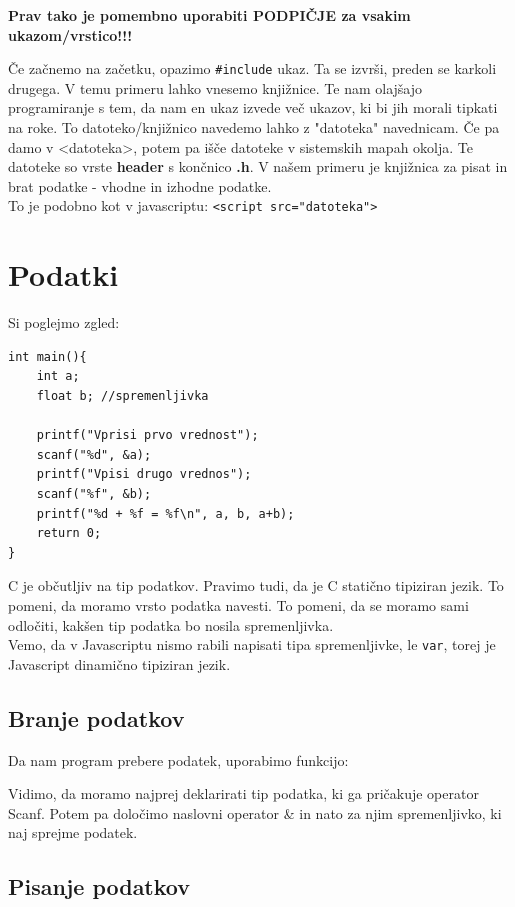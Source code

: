 \documentclass[a4paper, 12pt]{article}
\begin{document}
\textbf{Prav tako je pomembno uporabiti PODPIČJE za vsakim ukazom/vrstico!!!}

Če začnemo na začetku, opazimo \texttt{\#include} ukaz. Ta se izvrši, preden se karkoli drugega. V temu primeru lahko vnesemo knjižnice. Te nam olajšajo programiranje s tem, da nam en ukaz izvede več ukazov, ki bi jih morali tipkati na roke. To datoteko/knjižnico navedemo lahko z "datoteka" navednicam. Če pa damo v <datoteka>, potem pa išče datoteke v sistemskih mapah okolja. Te datoteke so vrste \textbf{header} s končnico \textbf{.h}. V našem primeru je knjižnica za pisat in brat podatke - vhodne in izhodne podatke.\\
To je podobno kot v javascriptu:  \lstinline|<script src="datoteka">|\ 
\section{Podatki}
Si poglejmo zgled:
\begin{lstlisting}
int main(){
	int a;
	float b; //spremenljivka

	printf("Vprisi prvo vrednost");
	scanf("%d", &a);
	printf("Vpisi drugo vrednos");
	scanf("%f", &b);
	printf("%d + %f = %f\n", a, b, a+b);
	return 0;
}
\end{lstlisting}

C je občutljiv na tip podatkov. Pravimo tudi, da je C statično tipiziran jezik. To pomeni, da moramo vrsto podatka navesti. 
To pomeni, da se moramo sami odločiti, kakšen tip podatka bo nosila spremenljivka.\\
Vemo, da v Javascriptu nismo rabili napisati tipa spremenljivke, le \texttt{var}, torej je Javascript dinamično tipiziran jezik.

\pagebreak

\subsection{Branje podatkov}

Da nam program prebere podatek, uporabimo funkcijo:

{\centering{}\par}

Vidimo, da moramo najprej deklarirati tip podatka, ki ga pričakuje operator Scanf. Potem pa določimo naslovni operator \& in nato za njim spremenljivko, ki naj sprejme podatek.

\subsection{Pisanje podatkov}
\end{document}
